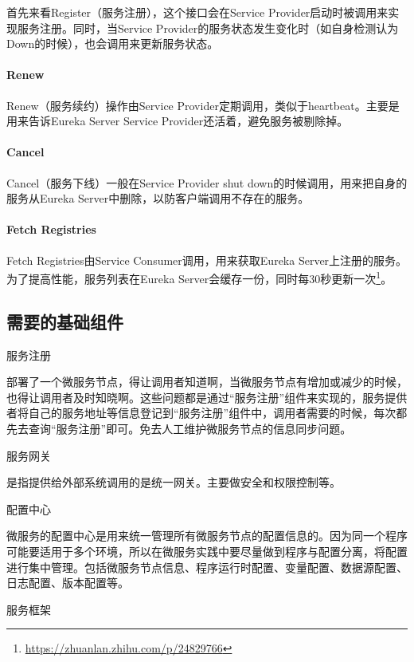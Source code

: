 \documentclass[../../../interview-questions.tex]{subfiles}
\begin{document}
首先来看Register（服务注册），这个接口会在Service Provider启动时被调用来实现服务注册。同时，当Service Provider的服务状态发生变化时（如自身检测认为Down的时候），也会调用来更新服务状态。

\paragraph{Renew}

Renew（服务续约）操作由Service Provider定期调用，类似于heartbeat。主要是用来告诉Eureka Server Service Provider还活着，避免服务被剔除掉。

\paragraph{Cancel}

Cancel（服务下线）一般在Service Provider shut down的时候调用，用来把自身的服务从Eureka Server中删除，以防客户端调用不存在的服务。

\paragraph{Fetch Registries}

Fetch Registries由Service Consumer调用，用来获取Eureka Server上注册的服务。为了提高性能，服务列表在Eureka Server会缓存一份，同时每30秒更新一次\footnote{\url{https://zhuanlan.zhihu.com/p/24829766}}。

\subsection{需要的基础组件}

服务注册

部署了一个微服务节点，得让调用者知道啊，当微服务节点有增加或减少的时候，也得让调用者及时知晓啊。这些问题都是通过“服务注册”组件来实现的，服务提供者将自己的服务地址等信息登记到“服务注册”组件中，调用者需要的时候，每次都先去查询“服务注册”即可。免去人工维护微服务节点的信息同步问题。

服务网关

是指提供给外部系统调用的是统一网关。主要做安全和权限控制等。

配置中心

微服务的配置中心是用来统一管理所有微服务节点的配置信息的。因为同一个程序可能要适用于多个环境，所以在微服务实践中要尽量做到程序与配置分离，将配置进行集中管理。包括微服务节点信息、程序运行时配置、变量配置、数据源配置、日志配置、版本配置等。

服务框架
\end{document}

